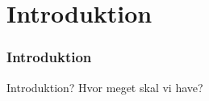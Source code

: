 \section[Introduktion]{Introduktion}

\begin{frame}
    \frametitle{Introduktion}
    Introduktion? Hvor meget skal vi have?
\end{frame}
